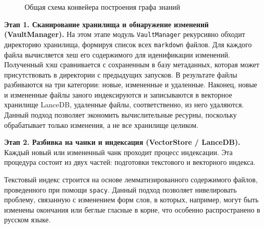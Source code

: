 \begin{figure}[H]
    \caption{Общая схема конвейера построения графа знаний}
    \label{fig:pipeline}
\end{figure}

\textbf{Этап 1. Сканирование хранилища и обнаружение изменений (VaultManager).}
На этом этапе модуль \texttt{VaultManager} рекурсивно обходит директорию хранилища,
формируя список всех \texttt{markdown} файлов.
Для каждого файла вычисляется хеш его содержимого для иденификации изменений.
Полученный хэш сравнивается с сохраненным в базу метаданных,
которая может присутствовать в директории с предыдущих запусков.
В результате файлы разбиваются на три категории: новые, измененные и удаленные.
Наконец, новые и измененные файлы заного индексируются и записываются в векторное хранилище LanceDB,
удаленные файлы, соответственно, из него удаляются.
Данный подход позволяет экономить вычислительные ресурны, поскольку обрабатывает только изменения,
а не все хранилище целиком.


\textbf{Этап 2. Разбивка на чанки и индексация (VectorStore / LanceDB).}
Каждый новый или измененный чанк проходит процесс индексации.
Эта процедура состоит из двух частей: подготовки текстового и векторного индекса.

Текстовый индекс строится на основе лемматизированного содержимого файлов, проведенного при помощи \texttt{spacy}.
Данный подход позволяет нивелировать проблему, связанную с изменением форм слов,
в которых, например, могут быть изменены окончания или беглые гласные в корне, что особенно распространено в русском языке.

